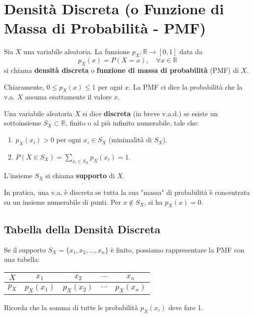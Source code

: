 \section{Densit\`a Discreta (o Funzione di Massa di Probabilit\`a - PMF)}
\begin{definition}
Sia $X$ una variabile aleatoria. La funzione $p_X: \mathbb{R} \to [0,1]$ data da
\[ p_X(x) = P(X=x), \quad \forall x \in \mathbb{R} \]
si chiama \textbf{densità discreta} o \textbf{funzione di massa di probabilità} (PMF) di $X$.
\end{definition}
Chiaramente, $0 \le p_X(x) \le 1$ per ogni $x$. La PMF ci dice la probabilità che la v.a. $X$ assuma esattamente il valore $x$.

\begin{definition}
Una variabile aleatoria $X$ si dice \textbf{discreta} (in breve v.a.d.) se esiste un sottoinsieme $S_X \subset \mathbb{R}$, finito o al più infinito numerabile, tale che:
\begin{enumerate}
    \item $p_X(x_i) > 0$ per ogni $x_i \in S_X$ (minimalità di $S_X$).
    \item $P(X \in S_X) = \sum_{x_i \in S_X} p_X(x_i) = 1$.
\end{enumerate}
L'insieme $S_X$ si chiama \textbf{supporto} di $X$.
\end{definition}
In pratica, una v.a. è discreta se tutta la sua "massa" di probabilità è concentrata su un insieme numerabile di punti. Per $x \notin S_X$, si ha $p_X(x) = 0$.

\subsection{Tabella della Densit\`a Discreta}
Se il supporto $S_X = \{x_1, x_2, \dots, x_n\}$ è finito, possiamo rappresentare la PMF con una tabella:
\begin{center}
\begin{tabular}{c|cccc}
$X$ & $x_1$ & $x_2$ & $\cdots$ & $x_n$ \\
\hline
$p_X$ & $p_X(x_1)$ & $p_X(x_2)$ & $\cdots$ & $p_X(x_n)$ \\
\end{tabular}
\end{center}
Ricorda che la somma di tutte le probabilità $p_X(x_i)$ deve fare 1.

